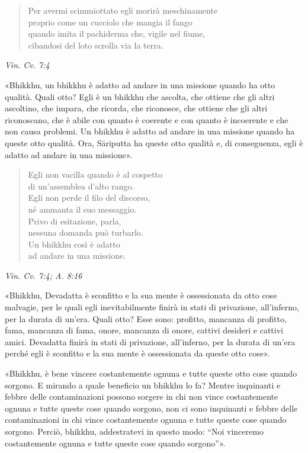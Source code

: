 \begin{quotation}
Per avermi scimmiottato egli morirà meschinamente \\
proprio come un cucciolo che mangia il fango \\
quando imita il pachiderma che, vigile nel fiume, \\
cibandosi del loto scrolla via la terra.
\end{quotation}

\emph{Vin. Cv. 7:4}


«Bhikkhu, un bhikkhu è adatto ad andare in una missione quando ha otto
qualità. Quali otto? Egli è un bhikkhu che ascolta, che ottiene che gli
altri ascoltino, che impara, che ricorda, che riconosce, che ottiene che
gli altri riconoscano, che è abile con quanto è coerente e con quanto è
incoerente e che non causa problemi. Un bhikkhu è adatto ad andare in
una missione quando ha queste otto qualità. Ora, Sāriputta ha queste
otto qualità e, di conseguenza, egli è adatto ad andare in una
missione».


\begin{quotation}
Egli non vacilla quando è al cospetto \\
di un’assemblea d’alto rango. \\
Egli non perde il filo del discorso, \\
né ammanta il suo messaggio. \\
Privo di esitazione, parla, \\
nessuna domanda può turbarlo. \\
Un bhikkhu così è adatto \\
ad andare in una missione.
\end{quotation}

\emph{Vin. Cv. 7:4; A. 8:16}


«Bhikkhu, Devadatta è sconfitto e la sua mente è ossessionata da otto
cose malvagie, per le quali egli inevitabilmente finirà in stati di
privazione, all’inferno, per la durata di un’era. Quali otto? Esse sono:
profitto, mancanza di profitto, fama, mancanza di fama, onore, mancanza
di onore, cattivi desideri e cattivi amici. Devadatta finirà in stati di
privazione, all’inferno, per la durata di un’era perché egli è sconfitto
e la sua mente è ossessionata da queste otto cose».


«Bhikkhu, è bene vincere costantemente ognuna e tutte queste otto cose
quando sorgono. E mirando a quale beneficio un bhikkhu lo fa? Mentre
inquinanti e febbre delle contaminazioni possono sorgere in chi non
vince costantemente ognuna e tutte queste cose quando sorgono, non ci
sono inquinanti e febbre delle contaminazioni in chi vince costantemente
ognuna e tutte queste cose quando sorgono. Perciò, bhikkhu, addestratevi
in questo modo: “Noi vinceremo costantemente ognuna e tutte queste cose
quando sorgono”».


